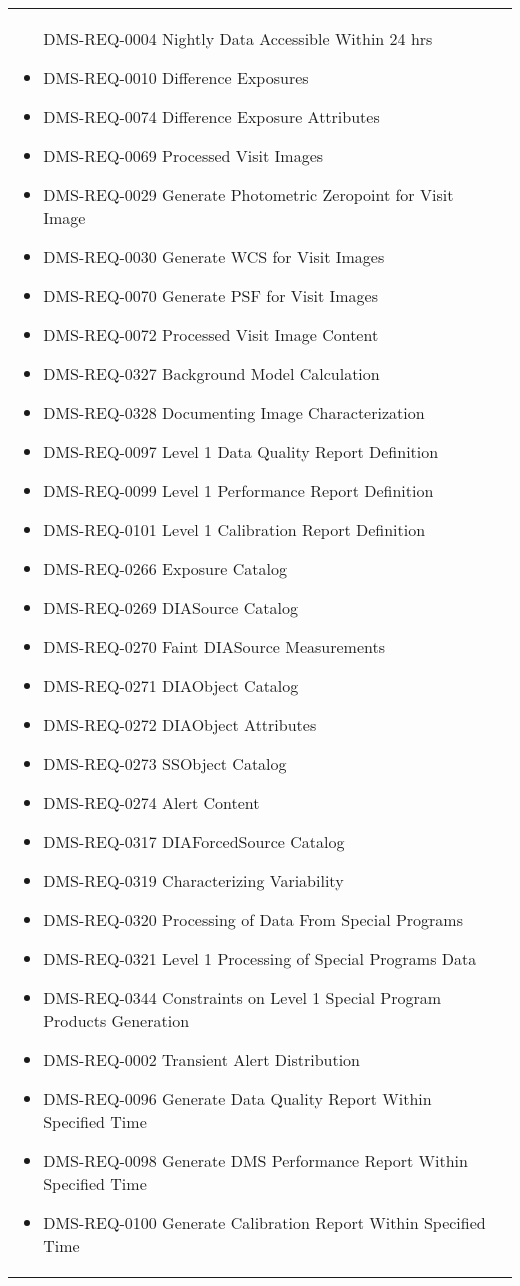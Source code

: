 \begin{xtabular}{lp{0.7\textwidth}}
\begin{itemize}DMS-REQ-0004 Nightly Data Accessible Within 24 hrs
\item DMS-REQ-0010 Difference Exposures
\item DMS-REQ-0074 Difference Exposure Attributes
\item DMS-REQ-0069 Processed Visit Images
\item DMS-REQ-0029 Generate Photometric Zeropoint for Visit Image
\item DMS-REQ-0030 Generate WCS for Visit Images
\item DMS-REQ-0070 Generate PSF for Visit Images
\item DMS-REQ-0072 Processed Visit Image Content
\item DMS-REQ-0327 Background Model Calculation
\item DMS-REQ-0328 Documenting Image Characterization
\item DMS-REQ-0097 Level 1 Data Quality Report Definition
\item DMS-REQ-0099 Level 1 Performance Report Definition
\item DMS-REQ-0101 Level 1 Calibration Report Definition
\item DMS-REQ-0266 Exposure Catalog
\item DMS-REQ-0269 DIASource Catalog
\item DMS-REQ-0270 Faint DIASource Measurements
\item DMS-REQ-0271 DIAObject Catalog
\item DMS-REQ-0272 DIAObject Attributes
\item DMS-REQ-0273 SSObject Catalog
\item DMS-REQ-0274 Alert Content
\item DMS-REQ-0317 DIAForcedSource Catalog
\item DMS-REQ-0319 Characterizing Variability
\item DMS-REQ-0320 Processing of Data From Special Programs
\item DMS-REQ-0321 Level 1 Processing of Special Programs Data
\item DMS-REQ-0344 Constraints on Level 1 Special Program Products Generation
\item DMS-REQ-0002 Transient Alert Distribution
\item DMS-REQ-0096 Generate Data Quality Report Within Specified Time
\item DMS-REQ-0098 Generate DMS Performance Report Within Specified Time
\item DMS-REQ-0100 Generate Calibration Report Within Specified Time

\end{itemize}
\end{xtabular}

